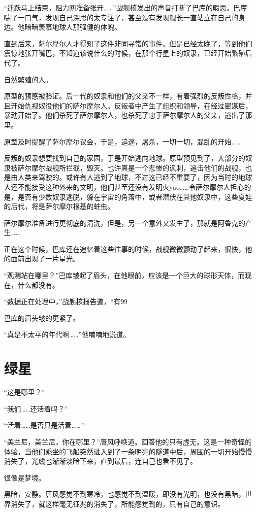 “迁跃马上结束，阻力网准备张开……”战舰核发出的声音打断了巴库的暇思。巴库喘了一口气，发现自己深思的太专注了，甚至没有发现舰长一直站立在自己的身边。他暗暗羡慕地球人那强健的体魄。

直到后来，萨尔摩尔人才得知了这件非同寻常的事件。但是已经太晚了，等到他们震惊地张开嘴巴，不知道该说什么的时候，在那个行星上的奴隶，已经开始繁殖后代了。

自然繁殖的人。

原型的预感被验证。后一代的奴隶和他们的父亲不一样，有着强烈的反叛性格，并且开始仇视奴役他们的萨尔摩尔人。反叛者中产生了组织和领导，在经过密谋后，暴动开始了。他们杀死了萨尔摩尔人，也杀死了忠于萨尔摩尔人的父亲，逃出了那里。

原型及时提醒了萨尔摩尔议会，于是，追逐，屠杀，一切一切，混乱的开始……

反叛的奴隶想要找到自己的家园，于是开始逃向地球。原型预见到了，大部分的奴隶被萨尔摩尔战舰所拦截，毁灭。也许真是一个悲惨的讽刺，追击他们的战舰，也是由人类来驾驶的。或许有人逃到了地球，不过这已经不重要了，因为当时的地球人还不能接受这种外来的文明，他们甚至还没有发明火yao……令萨尔摩尔人担心的是，是否有少数奴隶逃脱，躲在宇宙的角落中，或者潜伏在其他奴隶中，这些夏娃的后代，将是萨尔摩尔根基的蛀虫。

萨尔摩尔准备进行更彻底的清洗，但是，另一个意外又发生了，那就是阿鲁克的产生……

正在这个时候，巴库还在追忆着这些往事的时候，战舰微微颤动了起来，很快，他的面前出现了一片星光。

“观测站在哪里？”巴库皱起了眉头，在他眼前，应该是一个巨大的球形天体，而现在，什么都没有。

“数据正在处理中，”战舰核报告道，“有99%

巴库的眉头皱的更紧了。

“真是不太平的年代啊……”他喃喃地说道。

\chapter{绿星}

“这是哪里？”

“我们……还活着吗？”

“活着……是否只是活着……”

“美兰尼，美兰尼，你在哪里？”唐风呼唤道。回答他的只有虚无。这是一种奇怪的体验，当他们乘坐的飞船突然进入到了一条明亮的隧道中后，周围的一切开始慢慢消失了，光线也渐渐淡暗下来，直到最后，连自己也看不见了。

很像是梦境。

黑暗，安静。唐风感觉不到寒冷，也感觉不到温暖，即没有光明，也没有黑暗，世界消失了，就这样毫无征兆的消失了，所能感觉到的，只有自己的意识。

